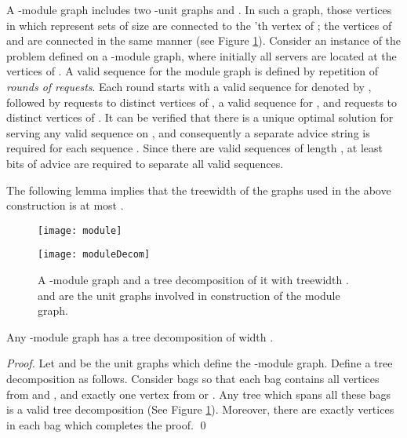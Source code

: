A -module graph  includes two -unit graphs  and . In such a graph, those vertices in  which represent sets of size  are connected to the 'th vertex of ; the vertices of  and  are connected in the same manner (see Figure \ref{fig:module}). Consider an instance of the \ks problem defined on a -module graph, where initially all servers are located at the vertices of . A valid sequence for the module graph is defined by repetition of \textit{rounds of requests}. Each round starts with a valid sequence for  denoted by , followed by  requests to distinct vertices of , a valid sequence for , and  requests to distinct vertices of . It can be verified that there is a unique optimal solution for serving any valid sequence on , and consequently a separate advice string is required for each sequence \cite{Bock11}. Since there are  valid sequences of length , 
at least  bits of advice are required to separate all valid sequences. 

The following lemma implies that the treewidth of the graphs used in the above construction is at most . 

\begin{figure}[t] 
\begin{minipage}{0.6 \linewidth}
\centering
\texttt{[image: module]}
\label{fig:module1}
\end{minipage}
\hspace{.2cm}
\begin{minipage}{0.4\linewidth}
\centering
\texttt{[image: moduleDecom]}
\label{fig:module2}
\end{minipage}
\caption{A -module graph and a tree decomposition of it with treewidth .  and  are the unit graphs involved in construction of the module graph. \label{fig:module}}
\end{figure}


\begin{lemma} \label{mytd}
 Any -module graph has a tree decomposition of width .
\end{lemma}

\begin{proof}
Let  and  be the unit graphs which define the -module graph. 
Define a tree decomposition as follows. Consider  bags so that each bag contains all vertices from  and  , and exactly one vertex from  or . Any tree which spans all these  bags is a valid tree decomposition (See Figure \ref{fig:module}). Moreover, there are exactly  vertices in each bag which completes the proof.
\qed 
\end{proof}

